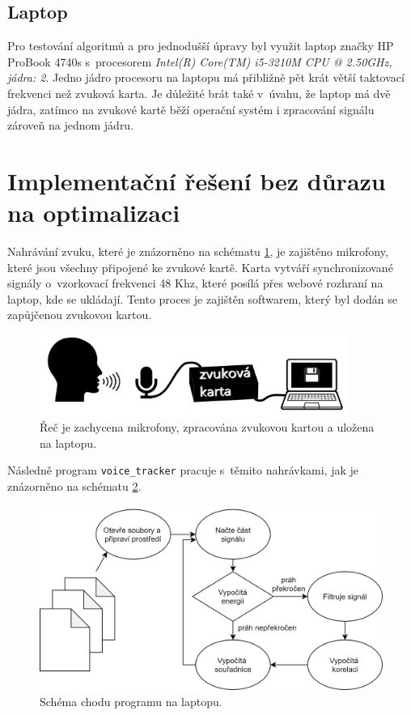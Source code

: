 \subsection{Laptop}

Pro testování algoritmů a pro jednodušší úpravy byl využit laptop značky HP ProBook 4740s s~procesorem \emph{Intel(R) Core(TM) i5-3210M CPU @ 2.50GHz, jádra: 2}. Jedno jádro procesoru na laptopu má přibližně pět krát větší taktovací frekvenci než zvuková karta. Je důležité brát také v~úvahu, že laptop má dvě jádra, zatímco na zvukové kartě běží operační systém i zpracování signálu zároveň na jednom jádru.

\section{Implementační řešení bez důrazu na optimalizaci}
\label{navrh implementace}

Nahrávání zvuku, které je znázorněno na schématu \ref{pic:schemanahravani}, je zajištěno mikrofony, které jsou všechny připojené ke zvukové kartě. Karta vytváří synchronizované signály o~vzorkovací frekvenci 48 Khz, které posílá přes webové rozhraní na laptop, kde se ukládají. Tento proces je zajištěn softwarem, který byl dodán se zapůjčenou zvukovou kartou.

\begin{figure}[hbt]
	\centering
	\includegraphics[width=0.9\textwidth]{obrazky-figures/schema_nahravani.png}
	\caption{Řeč je zachycena mikrofony, zpracována zvukovou kartou a uložena na laptopu.}
	\label{pic:schemanahravani}
\end{figure}

Následně program \texttt{voice\_tracker} pracuje s~těmito nahrávkami, jak je znázorněno na schématu \ref{pic:schemantb}.

\begin{figure}[hbt]
	\centering
	\includegraphics[width=1\textwidth]{obrazky-figures/schema_program.png}
	\caption{Schéma chodu programu na laptopu.}
	\label{pic:schemantb}
\end{figure}

